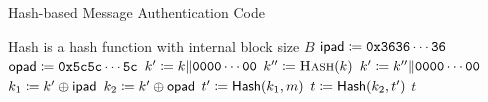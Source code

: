 \begin{algorithm}[t]
\caption{Hash-based Message Authentication Code}
\label{alg:hmac}
\begin{algorithmic}[1]
\Require \textsf{Hash} is a hash function with internal block size $B$
    \State $\textsf{ipad} \coloneqq{} \texttt{0x3636}\cdots\texttt{36}$
    \State $\textsf{opad} \coloneqq{} \texttt{0x5c5c}\cdots\texttt{5c}$
        \State $k' \coloneqq{} k\|\texttt{0000}\cdots\texttt{00}$
    \Else
        \State $k'' \coloneqq{} \textsc{Hash}(k)$
        \State $k' \coloneqq{} k''\|\texttt{0000}\cdots\texttt{00}$
    \EndIf
    \State $k_{1} \coloneqq{} k' \oplus \textsf{ipad}$
    \State $k_{2} \coloneqq{} k' \oplus \textsf{opad}$
    \State $t' \coloneqq{} \textsf{Hash}(k_{1}, m)$
    \State $t \coloneqq{} \textsf{Hash}(k_{2}, t')$
    \State \Return $t$
\EndProcedure
\end{algorithmic}
\end{algorithm}
